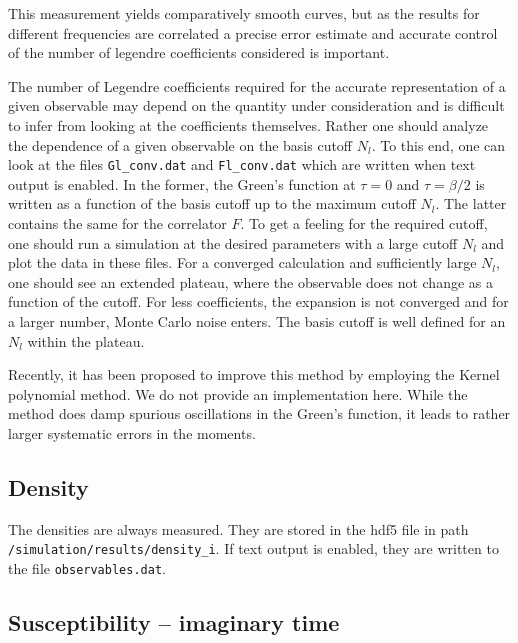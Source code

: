 \documentclass[aps,prb,floatfix,superscriptaddress,twocolumn,notitlepage]{revtex4-1}
\begin{document}
This measurement yields comparatively smooth curves, but as the results for different frequencies are correlated a precise error estimate and accurate control of the number of legendre coefficients considered is important.

The number of Legendre coefficients required for the accurate representation of a given observable may depend on the quantity under consideration and is difficult to infer from looking at the coefficients themselves. Rather one should analyze the dependence of a given observable on the basis cutoff $N_{l}$. To this end, one can look at the files \verb#Gl_conv.dat# and \verb#Fl_conv.dat# which are written when text output is enabled. In the former, the Green's function at $\tau=0$ and $\tau=\beta/2$ is written as a function of the basis cutoff up to the maximum cutoff $N_{l}$. The latter contains the same for the correlator $F$. To get a feeling for the required cutoff, one should run a simulation at the desired parameters with a large cutoff $N_{l}$ and plot the data in these files.
For a converged calculation and sufficiently large $N_{l}$, one should see an extended plateau, where the observable does not change as a function of the cutoff. For less coefficients, the expansion is not converged and for a larger number, Monte Carlo noise enters. The basis cutoff is well defined for an $N_{l}$ within the plateau.

Recently, it has been proposed to improve this method by employing the Kernel polynomial method\cite{Huang12}. We do not provide an implementation here. While the method does damp spurious oscillations in the Green's function, it leads to rather larger systematic errors in the moments.

\subsection{Density}

The densities are always measured. They are stored in the hdf5 file in path \verb#/simulation/results/density_i#. If text output is enabled, they are written to the file \verb#observables.dat#.

\subsection{Susceptibility -- imaginary time}
\end{document}
